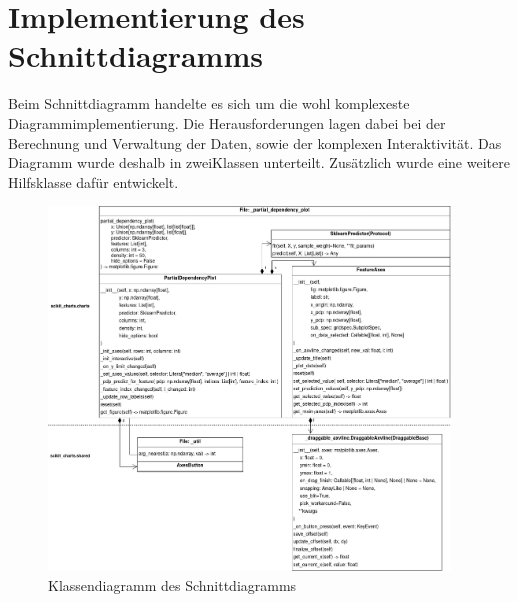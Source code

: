 \section{Implementierung des Schnittdiagramms}
\label{sec:impl_partial_dependency}

Beim Schnittdiagramm handelte es sich um die wohl komplexeste Diagrammimplementierung. Die Herausforderungen lagen dabei bei der Berechnung und Verwaltung der Daten, sowie der komplexen Interaktivität. Das Diagramm wurde deshalb in zwei\linebreak Klassen unterteilt. Zusätzlich wurde eine weitere Hilfsklasse dafür entwickelt.

\begin{figure}[H]
    \centering
    \includegraphics[width=0.95\textwidth]{images/uml_partial_dependence.png}
    \caption{Klassendiagramm des Schnittdiagramms}
    \label{fig:uml_partial_dependence}
\end{figure}

